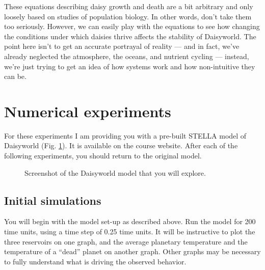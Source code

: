\documentclass[11pt,letterpaper]{article}
\begin{document}
These equations describing daisy growth and death are a bit arbitrary and only loosely based on studies of population biology. In other words, don't take them too seriously. However, we can easily play with the equations to see how changing the conditions under which daisies thrive affects the stability of Daisyworld. The point here isn't to get an accurate portrayal of reality --- and in fact, we've already neglected the atmosphere, the oceans, and nutrient cycling --- instead, we're just trying to get an idea of how systems work and how non-intuitive they can be.

\section{Numerical experiments}
For these experiments I am providing you with a pre-built STELLA model of Daisyworld (Fig. \ref{fig:daisyworld}). It is available on the course website. After each of the following experiments, you should return to the original model.

\begin{figure}[t]
\caption{Screenshot of the Daisyworld model that you will explore.}
\label{fig:daisyworld}
\end{figure}

\subsection{Initial simulations}
You will begin with the model set-up as described above. Run the model for 200 time units, using a time step of 0.25 time units. It will be instructive to plot the three reservoirs on one graph, and the average planetary temperature and the temperature of a ``dead'' planet on another graph. Other graphs may be necessary to fully understand what is driving the observed behavior.
\end{document}
